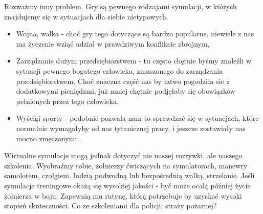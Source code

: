 \documentclass[10pt,a4paper]{book}
\begin{document}
\begin{problem*}
Rozważmy inny problem. Gry są pewnego rodzajami symulacji, w których znajdujemy się w sytuacjach dla siebie nietypowych.
\begin{itemize}
\item Wojna, walka - choć gry tego dotyczące są bardzo popularne, niewiele z nas ma życzenie wziąć udział w prawdziwym konflikcie zbrojnym,
\item Zarządzanie dużym przedsiębiorstwem - tu często chętnie byśmy znaleźli w sytuacji pewnego bogatego człowieka, zmuszonego do zarządzania przedsiębiorstwem. Choć znaczna część nas by łatwo pogodziła sie z dodatkowymi pieniędzmi, już mniej chętnie podjęłaby się obowiązków pełnionych przez tego człowieka.
\item Wyścigi sporty -  podobnie pozwala nam to sprawdzać się w sytuacjach, które normalnie wymagałyby od nas tytanicznej pracy, i jeszcze zostawiały nas mocno zmęczonymi.
\end{itemize}
Wirtualne symulacje mogą jednak dotyczyć nie naszej rozrywki, ale naszego szkolenia. Wyobraźmy sobie, żołnierzy ćwiczących na symulatorach, manewry samolotem, czołgiem, łodzią podwodną lub bezpośrednią walką, strzelanie. Jeśli symulacje treningowe okażą się wysokiej jakości - być może ocalą później życie żołnierza w boju. Zapewnią mu rutynę, którą potrzebuje by uzyskać wysoki stopień skuteczności. Co ze szkoleniami dla policji, straży pożarnej?
\end{problem*}
\end{document}
